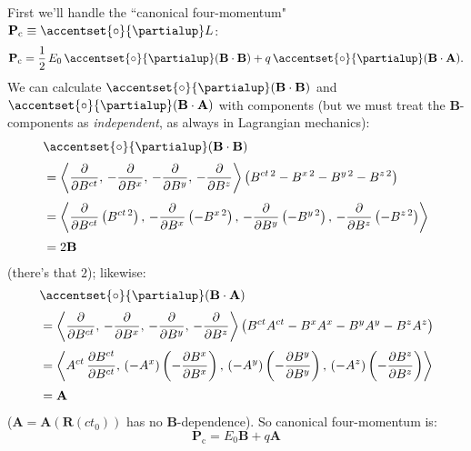 \documentclass[12pt]{article}
\renewcommand{\mathring}[1]{\accentset{\circ}{#1}}
\renewcommand{\vv}[1]{\mathbf{#1}}
\begin{document}
First we'll handle the ``canonical four-momentum" $\vv P _\textrm{c} \equiv \mathring{\partialup} L$:
\begin{equation*}
\vv P _\textrm{c} =  \dfrac{1}{2} \, E_0 \, \mathring{\partialup} (\vv B \cdot \vv B) + q \, \mathring{\partialup} (\vv B \cdot \vv A) .
\end{equation*}
We can calculate $\mathring{\partialup} (\vv B \cdot \vv B)$ and $\mathring{\partialup} (\vv B \cdot \vv A)$ with components (but we must treat the $\vv B$-components as \emph{independent}, as always in Lagrangian mechanics):
\begin{equation*}
\begin{split}
&\mathring{\partialup} (\vv B \cdot \vv B) \\[2pt]
&= \left \langle \dfrac{\partial}{\partial B^{ct}} , \,  - \dfrac{\partial}{\partial B^x} , \, - \dfrac{\partial}{\partial B^y} , \, - \dfrac{\partial}{\partial B^z} \right \rangle \left( B^{ct \, 2} - B^{x \, 2} - B^{y \, 2} - B^{z \, 2} \right) \\[3pt]
&= \left \langle \dfrac{\partial}{\partial B^{ct}} \left( B^{ct \, 2} \right) , \, - \dfrac{\partial}{\partial B^x} \left( - B^{x \, 2} \right) , \, - \dfrac{\partial}{\partial B^y} \left( - B^{y \, 2} \right)  , \, - \dfrac{\partial}{\partial B^z} \left( - B^{z \, 2} \right)  \right \rangle \\[2pt]
&= 2 \vv B
\end{split}
\end{equation*}
(there's that $2$); likewise:
\begin{equation*}
\begin{split}
&\mathring{\partialup} (\vv B \cdot \vv A) \\[2pt]
&= \left \langle \dfrac{\partial}{\partial B^{ct}} , \,  - \dfrac{\partial}{\partial B^x} , \, - \dfrac{\partial}{\partial B^y} , \, - \dfrac{\partial}{\partial B^z} \right \rangle \left( B^{ct} A^{ct} - B^x A^x - B^y A^y - B^z A^z \right) \\[3pt]
&= \left \langle A^{ct} \, \dfrac{\partial B^{ct}}{\partial B^{ct}} , \,  (- A^x) \left( - \dfrac{\partial B^x}{\partial B^x} \right) , \, (-A^y) \left( - \dfrac{\partial B^y}{\partial B^y} \right) , \, (-A^z) \left( - \dfrac{\partial B^z}{\partial B^z} \right) \right \rangle \\[2pt]
&= \vv A 
\end{split}
\end{equation*}
($\vv A = \vv A(\vv R(ct_0))$ has no $\vv B$-dependence). So canonical four-momentum is:
\begin{equation*}
\vv P _\textrm{c} =  E_0 \vv B + q \vv A
\end{equation*}
\end{document}
